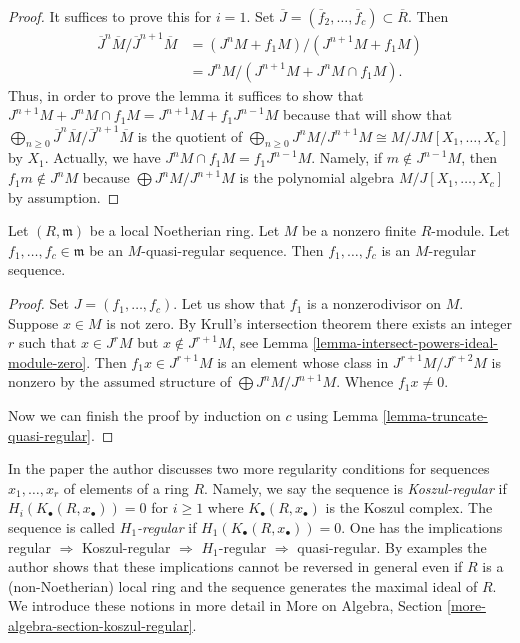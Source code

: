 \begin{proof}
It suffices to prove this for $i = 1$. Set
$\overline{J} = (\overline{f}_2, \ldots, \overline{f}_c) \subset \overline{R}$.
Then
\begin{align*}
\overline{J}^n\overline{M}/\overline{J}^{n + 1}\overline{M}
& =
(J^nM + f_1M)/(J^{n + 1}M + f_1M) \\
& = J^nM / (J^{n + 1}M + J^nM \cap f_1M).
\end{align*}
Thus, in order to prove the lemma it suffices to show that
$J^{n + 1}M + J^nM \cap f_1M = J^{n + 1}M + f_1J^{n - 1}M$
because that will show that
$\bigoplus_{n \geq 0}
\overline{J}^n\overline{M}/\overline{J}^{n + 1}\overline{M}$
is the quotient of
$\bigoplus_{n \geq 0} J^nM/J^{n + 1}M \cong M/JM[X_1, \ldots, X_c]$
by $X_1$. Actually, we have $J^nM \cap f_1M = f_1J^{n - 1}M$.
Namely, if $m \not \in J^{n - 1}M$, then $f_1m \not \in J^nM$
because $\bigoplus J^nM/J^{n + 1}M$ is the polynomial algebra
$M/J[X_1, \ldots, X_c]$ by assumption.
\end{proof}

\begin{lemma}
\label{lemma-quasi-regular-regular}
Let $(R, \mathfrak m)$ be a local Noetherian ring.
Let $M$ be a nonzero finite $R$-module.
Let $f_1, \ldots, f_c \in \mathfrak m$ be an $M$-quasi-regular sequence.
Then $f_1, \ldots, f_c$ is an $M$-regular sequence.
\end{lemma}

\begin{proof}
Set $J = (f_1, \ldots, f_c)$.
Let us show that $f_1$ is a nonzerodivisor on $M$.
Suppose $x \in M$ is not zero.
By Krull's intersection theorem there exists an integer $r$
such that $x \in J^rM$ but $x \not \in J^{r + 1}M$, see
Lemma \ref{lemma-intersect-powers-ideal-module-zero}.
Then $f_1 x \in J^{r + 1}M$ is an element whose class in
$J^{r + 1}M/J^{r + 2}M$ is nonzero by the assumed structure of
$\bigoplus J^nM/J^{n + 1}M$. Whence $f_1x \not = 0$.

\medskip\noindent
Now we can finish the proof by induction on $c$ using
Lemma \ref{lemma-truncate-quasi-regular}.
\end{proof}

\begin{remark}
\label{remark-koszul-regular}
In the paper \cite{Kabele} the author discusses two more
regularity conditions for sequences $x_1, \ldots, x_r$ of elements
of a ring $R$. Namely, we say the sequence is {\it Koszul-regular}
if $H_i(K_{\bullet}(R, x_{\bullet})) = 0$ for $i \geq 1$ where
$K_{\bullet}(R, x_{\bullet})$ is the Koszul complex. The sequence is
called {\it $H_1$-regular} if $H_1(K_{\bullet}(R, x_{\bullet})) = 0$.
One has the implications regular $\Rightarrow$ Koszul-regular $\Rightarrow$
$H_1$-regular $\Rightarrow$ quasi-regular. By examples the author shows that
these implications cannot be reversed in general even if $R$ is a
(non-Noetherian) local ring and the sequence generates the maximal ideal of
$R$. We introduce these notions in more detail in
More on Algebra, Section \ref{more-algebra-section-koszul-regular}.
\end{remark}

